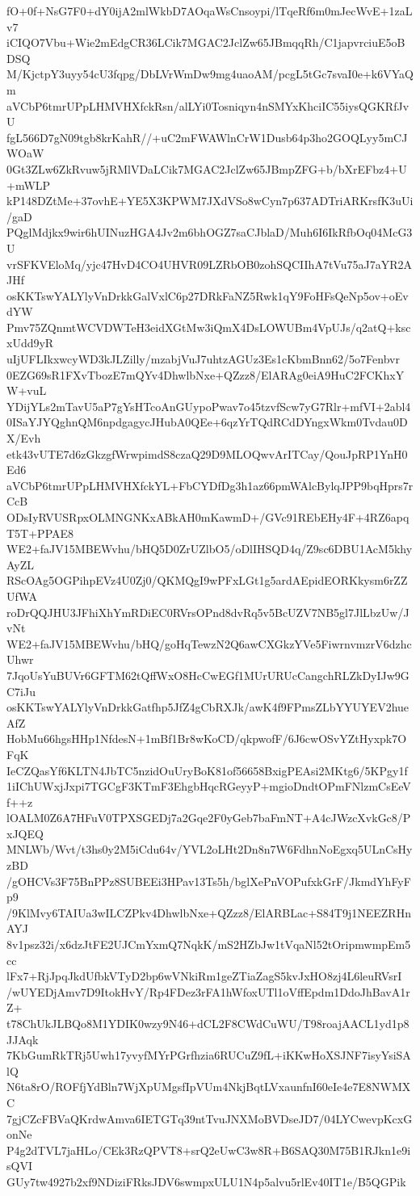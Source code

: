 fO+0f+NsG7F0+dY0ijA2mlWkbD7AOqaWsCnsoypi/lTqeRf6m0mJecWvE+1zaLv7
iCIQO7Vbu+Wie2mEdgCR36LCik7MGAC2JclZw65JBmqqRh/C1japvrciuE5oBDSQ
M/KjctpY3uyy54cU3fqpg/DbLVrWmDw9mg4uaoAM/pcgL5tGc7svaI0e+k6VYaQm
aVCbP6tmrUPpLHMVHXfckRsn/alLYi0Tosniqyn4nSMYxKhciIC55iysQGKRfJvU
fgL566D7gN09tgb8krKahR//+uC2mFWAWlnCrW1Dusb64p3ho2GOQLyy5mCJWOaW
0Gt3ZLw6ZkRvuw5jRMlVDaLCik7MGAC2JclZw65JBmpZFG+b/bXrEFbz4+U+mWLP
kP148DZtMe+37ovhE+YE5X3KPWM7JXdVSo8wCyn7p637ADTriARKrsfK3uUi/gaD
PQglMdjkx9wir6hUINuzHGA4Jv2m6bhOGZ7saCJblaD/Muh6I6IkRfbOq04McG3U
vrSFKVEloMq/yjc47HvD4CO4UHVR09LZRbOB0zohSQCIIhA7tVu75aJ7aYR2AJHf
osKKTswYALYlyVnDrkkGalVxlC6p27DRkFaNZ5Rwk1qY9FoHFsQeNp5ov+oEvdYW
Pmv75ZQnmtWCVDWTeH3eidXGtMw3iQmX4DsLOWUBm4VpUJs/q2atQ+kscxUdd9yR
uIjUFLIkxwcyWD3kJLZilly/mzabjVuJ7uhtzAGUz3Es1cKbmBnn62/5o7Fenbvr
0EZG69sR1FXvTbozE7mQYv4DhwlbNxe+QZzz8/ElARAg0eiA9HuC2FCKhxYW+vuL
YDijYLs2mTavU5aP7gYsHTcoAnGUypoPwav7o45tzvfScw7yG7Rlr+mfVI+2abl4
0ISaYJYQghnQM6npdgagycJHubA0QEe+6qzYrTQdRCdDYngxWkm0Tvdau0DX/Evh
etk43vUTE7d6zGkzgfWrwpimdS8czaQ29D9MLOQwvArITCay/QouJpRP1YnH0Ed6
aVCbP6tmrUPpLHMVHXfckYL+FbCYDfDg3h1az66pmWAlcBylqJPP9bqHprs7rCcB
ODsIyRVUSRpxOLMNGNKxABkAH0mKawmD+/GVc91REbEHy4F+4RZ6apqT5T+PPAE8
WE2+faJV15MBEWvhu/bHQ5D0ZrUZlbO5/oDlIHSQD4q/Z9sc6DBU1AcM5khyAyZL
RScOAg5OGPihpEVz4U0Zj0/QKMQgI9wPFxLGt1g5ardAEpidEORKkysm6rZZUfWA
roDrQQJHU3JFhiXhYmRDiEC0RVrsOPnd8dvRq5v5BcUZV7NB5gl7JlLbzUw/JvNt
WE2+faJV15MBEWvhu/bHQ/goHqTewzN2Q6awCXGkzYVe5FiwrnvmzrV6dzhcUhwr
7JqoUsYuBUVr6GFTM62tQffWxO8HcCwEGf1MUrURUcCangchRLZkDyIJw9GC7iJu
osKKTswYALYlyVnDrkkGatfhp5JfZ4gCbRXJk/awK4f9FPmsZLbYYUYEV2hueAfZ
HobMu66hgsHHp1NfdesN+1mBf1Br8wKoCD/qkpwofF/6J6cwOSvYZtHyxpk7OFqK
IeCZQasYf6KLTN4JbTC5nzidOuUryBoK81of56658BxigPEAsi2MKtg6/5KPgy1f
1iIChUWxjJxpi7TGCgF3KTmF3EhgbHqcRGeyyP+mgioDndtOPmFNlzmCsEeVf++z
lOALM0Z6A7HFuV0TPXSGEDj7a2Gqe2F0yGeb7baFmNT+A4cJWzcXvkGc8/PxJQEQ
MNLWb/Wvt/t3hs0y2M5iCdu64v/YVL2oLHt2Dn8n7W6FdhnNoEgxq5ULnCsHyzBD
/gOHCVs3F75BnPPz8SUBEEi3HPav13Ts5h/bglXePnVOPufxkGrF/JkmdYhFyFp9
/9KlMvy6TAIUa3wILCZPkv4DhwlbNxe+QZzz8/ElARBLac+S84T9j1NEEZRHnAYJ
8v1psz32i/x6dzJtFE2UJCmYxmQ7NqkK/mS2HZbJw1tVqaNl52tOripmwmpEm5cc
lFx7+RjJpqJkdUfbkVTyD2bp6wVNkiRm1geZTiaZagS5kvJxHO8zj4L6leuRVsrI
/wUYEDjAmv7D9ItokHvY/Rp4FDez3rFA1hWfoxUTl1oVffEpdm1DdoJhBavA1rZ+
t78ChUkJLBQo8M1YDIK0wzy9N46+dCL2F8CWdCuWU/T98roajAACL1yd1p8JJAqk
7KbGumRkTRj5Uwh17yvyfMYrPGrfhzia6RUCuZ9fL+iKKwHoXSJNF7isyYsiSAlQ
N6ta8rO/ROFfjYdBln7WjXpUMgsfIpVUm4NkjBqtLVxaunfnI60eIe4e7E8NWMXC
7gjCZcFBVaQKrdwAmva6IETGTq39ntTvuJNXMoBVDseJD7/04LYCwevpKcxGonNe
P4g2dTVL7jaHLo/CEk3RzQPVT8+srQ2eUwC3w8R+B6SAQ30M75B1RJkn1e9isQVI
GUy7tw4927b2xf9NDiziFRksJDV6swmpxULU1N4p5alvu5rlEv40IT1e/B5QGPik
